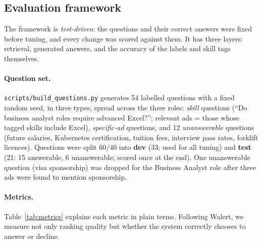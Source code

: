 \subsection{Evaluation framework}\label{sec:eval}

The framework is \emph{test-driven}: the questions and their correct answers were fixed before tuning, and every change was scored against them. It has three layers: retrieval, generated answers, and the accuracy of the labels and skill tags themselves.

\paragraph{Question set.} \texttt{scripts/build\_questions.py} generates 54 labelled questions with a fixed random seed, in three types, spread across the three roles: \emph{skill} questions (``Do business analyst roles require advanced Excel?''; relevant ads = those whose tagged skills include Excel), \emph{specific-ad} questions, and 12 \emph{unanswerable} questions (future salaries, Kubernetes certification, tuition fees, interview pass rates, forklift licences). Questions were split 60/40 into \textbf{dev} (33; used for all tuning) and \textbf{test} (21: 15 answerable, 6 unanswerable; scored once at the end). One unanswerable question (visa sponsorship) was dropped for the Business Analyst role after three ads were found to mention sponsorship.

\paragraph{Metrics.} Table~\ref{tab:metrics} explains each metric in plain terms. Following Walert, we measure not only ranking quality but whether the system correctly chooses to answer or decline.

